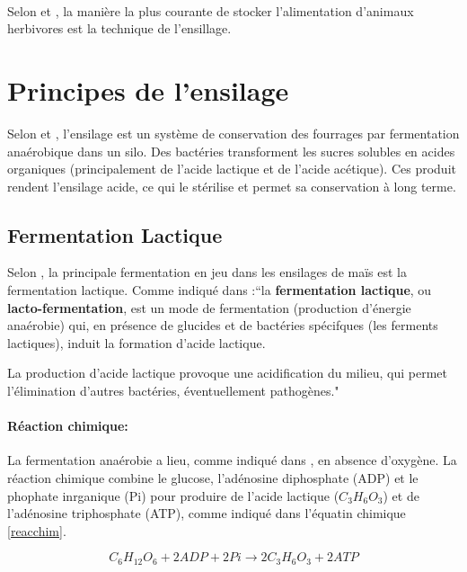 \documentclass[12pt,a4paper]{report}
\begin{document}
\paragraph{} Selon \cite{noauthor_ensilage_2018} et \cite{cuvelier_lalimentation_2015}, la manière la plus courante de stocker l'alimentation d'animaux herbivores est la technique de l'ensillage.


\section{Principes de l'ensilage}

Selon \cite{noauthor_ensilage_2018} et \cite{cuvelier_lalimentation_2015}, l’ensilage est un système de conservation des fourrages par fermentation anaérobique dans un silo. Des bactéries transforment les sucres solubles en acides organiques (principalement de l'acide lactique et de l’acide acétique). Ces produit rendent l'ensilage acide, ce qui le stérilise et permet sa conservation à long terme.

\subsection{Fermentation Lactique}
Selon \cite{noauthor_ensilage_2018}, la principale fermentation en jeu dans les ensilages de maïs est la fermentation lactique. Comme indiqué dans \cite{noauthor_fermentation_2018} :“la \textbf{fermentation lactique}, ou \textbf{lacto-fermentation}, est un mode de fermentation (production d'énergie anaérobie) qui, en présence de glucides et de bactéries spécifques (les ferments lactiques), induit la formation d'acide lactique.

La production d'acide lactique provoque une acidification du milieu, qui permet l'élimination d'autres bactéries, éventuellement pathogènes."

\paragraph{Réaction chimique:} La fermentation anaérobie a lieu, comme indiqué dans \cite{noauthor_fermentation_2018}, en absence d'oxygène. La réaction chimique combine le glucose, l'adénosine diphosphate (ADP) et le phophate inrganique (Pi) pour produire de l'acide lactique ($C_3H_6O_3$) et de l'adénosine triphosphate (ATP), comme indiqué dans l'équatin chimique \ref{reacchim}.

\begin{equation}
	C_6H_{12}O_6 + 2 ADP + 2 Pi \rightarrow 2 C_3H_6O_3 + 2 ATP
	\label{reacchim}
\end{equation}
\end{document}
